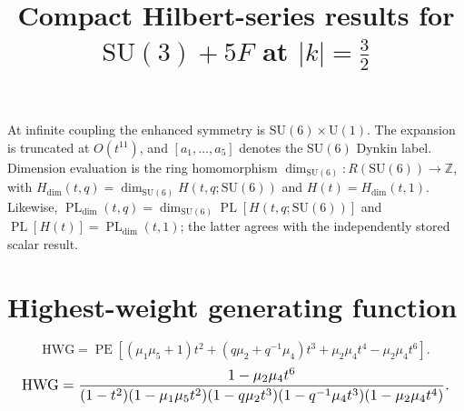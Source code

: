\documentclass[10pt]{article}
\title{Compact Hilbert-series results for $\mathrm{SU(3)}+5F$ at $\lvert k\rvert=\frac{3}{2}$}
\date{}
\newcommand{\PE}{\operatorname{PE}}
\begin{document}
\maketitle
At infinite coupling the enhanced symmetry is $\mathrm{SU}(6)\times\mathrm{U}(1)$.
The expansion is truncated at $O(t^{11})$, and
$[a_1,\ldots,a_5]$ denotes the $\mathrm{SU}(6)$ Dynkin label.
Dimension evaluation is the ring homomorphism
$\dim_{\mathrm{SU}(6)}:R(\mathrm{SU}(6))\to\mathbb{Z}$, with
$H_{\mathrm{dim}}(t,q)=\dim_{\mathrm{SU}(6)}H(t,q;\mathrm{SU}(6))$
and $H(t)=H_{\mathrm{dim}}(t,1)$.  Likewise,
$\operatorname{PL}_{\mathrm{dim}}(t,q)=\dim_{\mathrm{SU}(6)}
\operatorname{PL}[H(t,q;\mathrm{SU}(6))]$ and
$\operatorname{PL}[H(t)]=\operatorname{PL}_{\mathrm{dim}}(t,1)$;
the latter agrees with the independently stored scalar result.

\section{Highest-weight generating function}
\begin{equation}
\mathrm{HWG}=\PE\!\left[(\mu_1\mu_5+1)t^2+(q\mu_2+q^{-1}\mu_4)t^3
+\mu_2\mu_4t^4-\mu_2\mu_4t^6\right].
\end{equation}
\begin{equation}
\resizebox{0.98\linewidth}{!}{${\displaystyle
\mathrm{HWG}=\frac{1-\mu_2\mu_4t^6}
{(1-t^2)(1-\mu_1\mu_5t^2)(1-q\mu_2t^3)(1-q^{-1}\mu_4t^3)(1-\mu_2\mu_4t^4)}.}$}
\end{equation}
\end{document}
